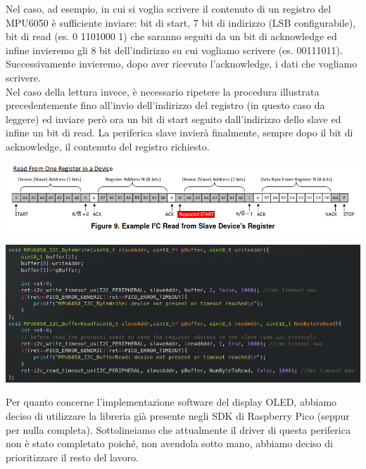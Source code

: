Nel caso, ad esempio, in cui si voglia scrivere il contenuto di un
registro del MPU6050 è sufficiente inviare: bit di start, 7 bit di
indirizzo (LSB configurabile), bit di read (es. 0 1101000 1) che saranno
seguiti da un bit di acknowledge ed infine invieremo gli 8 bit
dell'indirizzo su cui vogliamo scrivere (es. 00111011). Successivamente
invieremo, dopo aver ricevuto l'acknowledge, i dati che vogliamo
scrivere.\\
Nel caso della lettura invece, è necessario ripetere la procedura
illustrata precedentemente fino all'invio dell'indirizzo del registro
(in questo caso da leggere) ed inviare però ora un bit di start seguito
dall'indirizzo dello slave ed infine un bit di read. La periferica slave
invierà finalmente, sempre dopo il bit di acknowledge, il contenuto del
registro richiesto.

\begin{center}
\includegraphics[scale=0.7]{figures/image39.png}
\captionsetup{type=figure}
\end{center}

\begin{center}
\includegraphics[scale=0.7]{figures/image35.png}
\captionsetup{type=figure}
\end{center}

Per quanto concerne l'implementazione software del display OLED, abbiamo
deciso di utilizzare la libreria già presente negli SDK di Raspberry
Pico (seppur per nulla completa). Sottolineiamo che attualmente il
driver di questa periferica non è stato completato poiché, non avendola
sotto mano, abbiamo deciso di prioritizzare il resto del lavoro.

